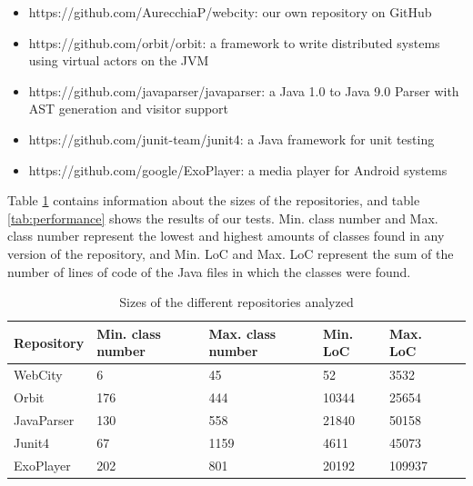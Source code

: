 \documentclass[]{usiinfbachelorproject}
\begin{document}
\begin{itemize}
    \item https://github.com/AurecchiaP/webcity: our own repository on GitHub
    \item https://github.com/orbit/orbit: a framework to write distributed systems using virtual actors on the JVM
    \item https://github.com/javaparser/javaparser: a Java 1.0 to Java 9.0 Parser with AST generation and visitor support
    \item https://github.com/junit-team/junit4: a Java framework for unit testing
    \item https://github.com/google/ExoPlayer: a media player for Android systems
\end{itemize}

Table \ref{tab:performance2} contains information about the sizes of the repositories, and table \ref{tab:performance} shows the results of our tests.
Min. class number and Max. class number represent the lowest and highest amounts of classes found in any version of the repository,  and Min. LoC and Max. LoC represent the sum of the number of lines of code of the Java files in which the classes were found.

\begin{table}[H]
    \begin{center}
        \begin{tabular}{ | l | l | l | l | l | l |}
        \hline
        Repository & Min. class number & Max. class number & Min. LoC & Max. LoC \\ \hline
        WebCity & 6 & 45 & 52 & 3532 \\ \hline
        Orbit & 176 & 444 & 10344 & 25654 \\ \hline
        JavaParser & 130 & 558 & 21840 & 50158 \\ \hline
        Junit4 & 67 & 1159 & 4611 & 45073 \\ \hline
        ExoPlayer & 202 & 801 & 20192 & 109937 \\ \hline
        \end{tabular}
    \end{center}
    \caption{Sizes of the different repositories analyzed}
    \label{tab:performance2}
\end{table}
\end{document}
